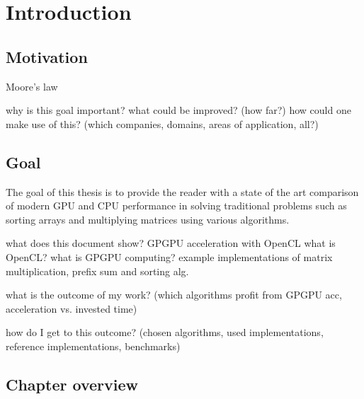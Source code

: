 \section{Introduction}


\subsection{Motivation}
Moore's law


why is this goal important?
what could be improved? (how far?)
how could one make use of this? (which companies, domains, areas of application, all?)

\subsection{Goal}
The goal of this thesis is to provide the reader with a state of the art comparison of modern GPU and CPU performance in solving traditional problems such as sorting arrays and multiplying matrices using various algorithms.




what does this document show?
GPGPU acceleration with OpenCL
what is OpenCL? what is GPGPU computing?
example implementations of matrix multiplication, prefix sum and sorting alg.

what is the outcome of my work? (which algorithms profit from GPGPU acc, acceleration vs. invested time)


how do I get to this outcome? (chosen algorithms, used implementations, reference implementations, benchmarks)

\subsection{Chapter overview}


